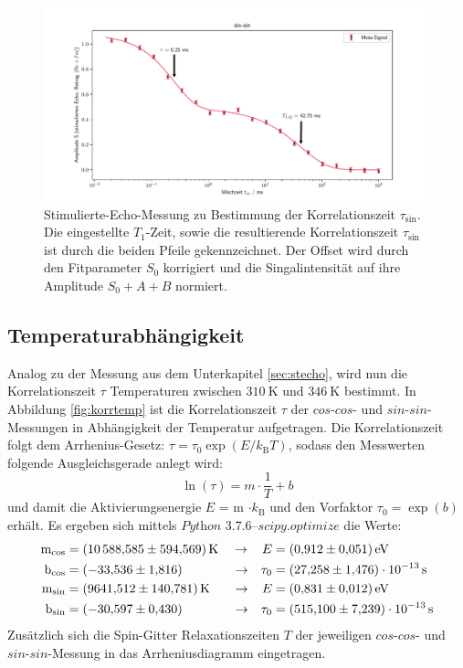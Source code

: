 \begin{figure}[H]
    \centering
    \includegraphics[width=\textwidth]{Auswertung/Para_der_Korrfkt/sin_sin.pdf}
    \caption{Stimulierte-Echo-Messung zu Bestimmung der Korrelationszeit
    $\tau_{\text{sin}}$. Die eingestellte $T_1$-Zeit, sowie die resultierende
    Korrelationszeit $\tau_{\text{sin}}$ ist durch die beiden Pfeile gekennzeichnet.
    Der Offset wird durch den Fitparameter $S_0$ korrigiert und die
    Singalintensität auf ihre Amplitude $S_0+A+B$ normiert.}
    \label{fig:sin}
\end{figure}

\subsection{Temperaturabhängigkeit}
\label{sec:tempabh}
Analog zu der Messung aus dem Unterkapitel \ref{sec:stecho}, wird nun die
Korrelationszeit $\tau$ Temperaturen zwischen $\SI{310}{\kelvin}$
und $\SI{346}{\kelvin}$ bestimmt. In Abbildung \ref{fig:korrtemp}
ist die Korrelationszeit $\tau$ der $cos$-$cos$- und $sin$-$sin$-Messungen
in Abhängigkeit der Temperatur aufgetragen. Die Korrelationszeit folgt
dem Arrhenius-Gesetz: $\tau = \tau_0 \exp{(E/k_{\text{B}}T)}$, sodass den Messwerten
folgende Ausgleichsgerade anlegt wird:
\begin{equation*}
  \ln{(\tau)} = m \cdot \frac{1}{T} + b
\end{equation*}
\noindent
und damit die Aktivierungsenergie $E$ = m $\cdot k_{\text{B}}$ und den Vorfaktor
$\tau_0 = \exp{(b)}$ erhält. Es ergeben sich mittels
$\textit{Python 3.7.6--scipy.optimize}$ die Werte:
\begin{align*}
  \text{m}_{\text{cos}} &= \SI{10588,585\pm594,569}{\kelvin}
  \quad\rightarrow
  &E &= \SI{0.912\pm0.051}{\electronvolt} \\
  \text{b}_{\text{cos}} &= \SI{-33,536\pm1,816}
  \qquad\quad\,\;\;\rightarrow
  &\tau_0 &= \SI{27,258\pm1,476 e-13}{\second} \\
  \text{m}_{\text{sin}} &= \SI{9641,512\pm140,781}{\kelvin}
  \,\;\;\quad\rightarrow
  &E &= \SI{0.831\pm0.012}{\electronvolt} \\
  \text{b}_{\text{sin}} &= \SI{-30,597\pm0.430}
  \qquad\quad\,\;\;\rightarrow
  &\tau_0 &= \SI{515,100\pm7,239 e-13}{\second}
\end{align*}
\noindent
Zusätzlich sich die Spin-Gitter Relaxationszeiten $T$ der jeweiligen $cos$-$cos$-
und $sin$-$sin$-Messung in das Arrheniusdiagramm eingetragen.


